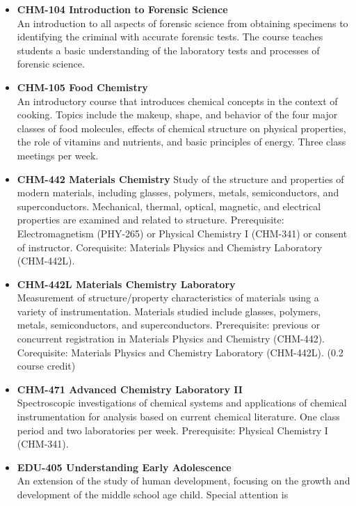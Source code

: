 \documentclass[
  letterpaper,
]{scrbook}
\providecommand{\tightlist}{%
  \setlength{\itemsep}{0pt}\setlength{\parskip}{0pt}}
\begin{document}
\begin{itemize}
\tightlist
\item
  \textbf{CHM-104 Introduction to Forensic Science}\\
  An introduction to all aspects of forensic science from obtaining
  specimens to identifying the criminal with accurate forensic tests.
  The course teaches students a basic understanding of the laboratory
  tests and processes of forensic science.
\item
  \textbf{CHM-105 Food Chemistry}\\
  An introductory course that introduces chemical concepts in the
  context of cooking. Topics include the makeup, shape, and behavior of
  the four major classes of food molecules, effects of chemical
  structure on physical properties, the role of vitamins and nutrients,
  and basic principles of energy. Three class meetings per week.
\item
  \textbf{CHM-442 Materials Chemistry} Study of the structure and
  properties of modern materials, including glasses, polymers, metals,
  semiconductors, and superconductors. Mechanical, thermal, optical,
  magnetic, and electrical properties are examined and related to
  structure. Prerequisite: Electromagnetism (PHY-265) or Physical
  Chemistry I (CHM-341) or consent of instructor. Corequisite: Materials
  Physics and Chemistry Laboratory (CHM-442L).
\item
  \textbf{CHM-442L Materials Chemistry Laboratory}\\
  Measurement of structure/property characteristics of materials using a
  variety of instrumentation. Materials studied include glasses,
  polymers, metals, semiconductors, and superconductors. Prerequisite:
  previous or concurrent registration in Materials Physics and Chemistry
  (CHM-442). Corequisite: Materials Physics and Chemistry Laboratory
  (CHM-442L). (0.2 course credit)
\item
  \textbf{CHM-471 Advanced Chemistry Laboratory II}\\
  Spectroscopic investigations of chemical systems and applications of
  chemical instrumentation for analysis based on current chemical
  literature. One class period and two laboratories per week.
  Prerequisite: Physical Chemistry I (CHM-341).
\item
  \textbf{EDU-405 Understanding Early Adolescence}\\
  An extension of the study of human development, focusing on the growth
  and development of the middle school age child. Special attention is

\end{itemize}
\end{document}
